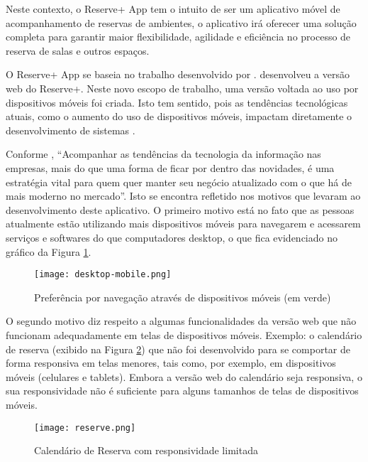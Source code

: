 \documentclass[12pt]{article}
\begin{document}
Neste contexto, o Reserve+ App tem o intuito de ser um aplicativo móvel de acompanhamento de reservas de ambientes, o aplicativo irá oferecer uma solução completa para garantir maior flexibilidade, agilidade e eficiência no processo de reserva de salas e outros espaços.

O Reserve+ App se baseia no trabalho desenvolvido por \cite{cotrim}. \cite{cotrim} desenvolveu a versão web do Reserve+. Neste novo escopo de trabalho, uma versão voltada ao uso por dispositivos móveis foi criada. Isto tem sentido, pois as tendências tecnológicas atuais, como o aumento do uso de dispositivos móveis, impactam diretamente o desenvolvimento de sistemas \cite{sales}. 

Conforme \cite{zendesk}, ``Acompanhar as tendências da tecnologia da informação nas empresas, mais do que uma forma de ficar por dentro das novidades, é uma estratégia vital para quem quer manter seu negócio atualizado com o que há de mais moderno no mercado''. Isto se encontra refletido nos motivos que levaram ao desenvolvimento deste aplicativo. O primeiro motivo está no fato que as pessoas atualmente estão utilizando mais dispositivos móveis para navegarem e acessarem serviços e softwares do que computadores desktop, o que fica evidenciado no gráfico da Figura \ref{fig:desktop-mobile}.

\begin{figure}[H]
\centering
\texttt{[image: desktop-mobile.png]}
\caption[]{Preferência por navegação através de dispositivos móveis (em verde)\footnotemark}
\label{fig:desktop-mobile}
\end{figure}

O segundo motivo diz respeito a algumas funcionalidades da versão web que não funcionam adequadamente em telas de dispositivos móveis. Exemplo: o calendário de reserva (exibido na Figura \ref{fig:reserve}) que não foi desenvolvido para se comportar de forma responsiva em telas menores, tais como, por exemplo, em dispositivos móveis (celulares e tablets). Embora a versão web do calendário seja responsiva, o sua responsividade não é suficiente para alguns tamanhos de telas de dispositivos móveis.

\begin{figure}[!htb]
\centering
\texttt{[image: reserve.png]}
\caption{Calendário de Reserva com responsividade limitada \cite{cotrim}}
\label{fig:reserve}
\end{figure}
\end{document}
